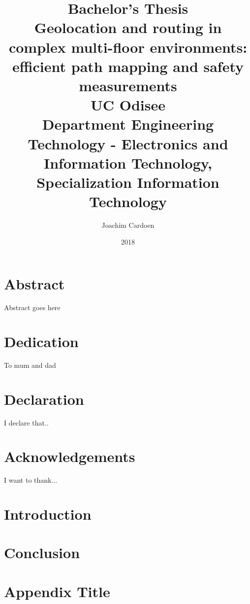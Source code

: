 \documentclass[twoside,12pt]{report}
\title{
    {\large Bachelor's Thesis}\\
    {Geolocation and routing in complex multi-floor environments: efficient path mapping and safety measurements}\\
    {\large UC Odisee}\\
    {\large Department Engineering Technology - Electronics and Information Technology, Specialization Information Technology}\\
}
\author{Joachim Cardoen}
\date{2018}
\begin{document}
\maketitle

\pagestyle{empty}


\chapter*{Abstract}
Abstract goes here

\chapter*{Dedication}
To mum and dad

\chapter*{Declaration}
I declare that..

\chapter*{Acknowledgements}
I want to thank...

\tableofcontents

\chapter{Introduction}


\chapter{Conclusion}


\appendix
\chapter{Appendix Title}

\end{document}
